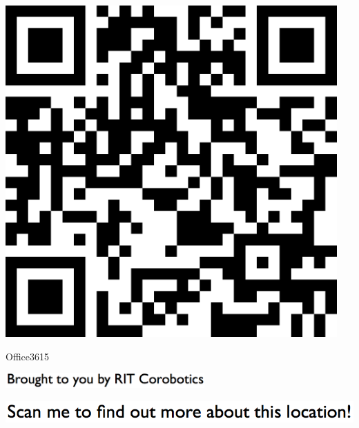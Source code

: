 \documentclass[letterpaper]{article}
\begin{document}
 \begingroup 
 \centerline{\includegraphics[scale=1,width=5in,height=5in]{Office3615.png}} 
 \endgroup 
 \vspace*{\fill} 

 \hfill{\small Office3615} 

  \vspace{0.7in} 
 
 \centerline{\includegraphics[scale=1,width=3in]{text-bottom.png}} 
 
 \pagebreak 
{} 
 \vspace*{\fill} 
 
  \centerline{\includegraphics[scale=1,width=6in]{text-top.png}} 
 
 \vspace{0.5in} 
 
\end{document}
